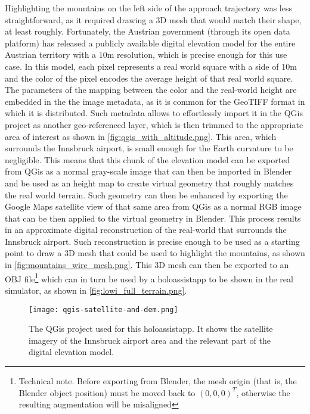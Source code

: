 Highlighting the mountains on the left side of the approach trajectory was less straightforward, as it required drawing a 3D mesh that would match their shape, at least roughly. Fortunately, the Austrian government (through its open data platform) has released a publicly available digital elevation model for the entire Austrian territory with a $10$m resolution, which is precise enough for this use case\cite{land_karnten_digitales_nodate}. In this model, each pixel represents a real world square with a side of $10$m and the color of the pixel encodes the average height of that real world square. The parameters of the mapping between the color and the real-world height are embedded in the the image metadata, as it is common for the GeoTIFF\cite{the_open_geospatial_consortium_ogc_2019} format in which it is distributed. Such metadata allows to effortlessly import it in the QGis project as another geo-referenced layer, which is then trimmed to the appropriate area of interest as shown in \autoref{fig:qgis_with_altitude.png}. This area, which surrounds the Innsbruck airport, is small enough for the Earth curvature to be negligible. This means that this chunk of the elevation model can be exported from QGis as a normal gray-scale image that can then be imported in Blender and be used as an height map to create virtual geometry that roughly matches the real world terrain. Such geometry can then be enhanced by exporting the Google Maps satellite view of that same area from QGis as a normal RGB image that can be then applied to the virtual geometry in Blender. This process results in an approximate digital reconstruction of the real-world that surrounds the Innsbruck airport. Such reconstruction is precise enough to be used as a starting point to draw a 3D mesh that could be used to highlight the mountains, as shown in \autoref{fig:mountains_wire_mesh.png}. This 3D mesh can then be exported to an OBJ file\footnote{Technical note. Before exporting from Blender, the mesh origin (that is, the Blender object position) must be moved back to $(0, 0, 0)^T$, otherwise the resulting augmentation will be misaligned} which can in turn be used by a \gls{holoassistapp} to be shown in the real simulator, as shown in \autoref{fig:lowi_full_terrain.png}.

\begin{figure}
  \centering
  \texttt{[image: qgis-satellite-and-dem.png]}
  \caption{The QGis project used for this \gls{holoassistapp}. It shows the satellite imagery of the Innsbruck airport area and the relevant part of the digital elevation model.}\label{fig:qgis_with_altitude.png}
\end{figure}

